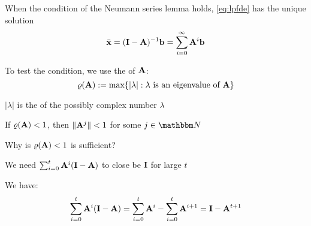 \begin{frame}

    \vspace{.7em}
    When the condition of the Neumann series lemma holds, \eqref{eq:lpfde}
    has the unique solution
    \begin{equation*}
        \bar {{\mathbf x}} 
        = (\mathbf I - \mathbf A)^{-1} {\mathbf b} 
        = \sum_{i=0}^{\infty} \mathbf A^i  {\mathbf b} 
    \end{equation*}
    
    To test the condition, we use the   of
    $\mathbf A$:
    \begin{equation*}
        \label{eq:srmn}
        \varrho(\mathbf A) := \max \{  |\lambda|  :  \lambda \text{ is an eigenvalue of } \mathbf A \}
    \end{equation*}
    
    \vspace{1em}
    $|\lambda|$ is the  of the possibly complex number
    $\lambda$
    

\end{frame}

\begin{frame}

    \vspace{2em}
    \Fact
    If $\varrho(\mathbf A) < 1$, then $\| \mathbf A^j \| < 1$ for some $j \in \NN$
    
    \vspace{.7em}
    Why is $\varrho(\mathbf A) < 1$ is sufficient?
    
    We need
    $\sum_{i=0}^t \mathbf A^i (\mathbf I - \mathbf A)$ to close be $\mathbf I$ for
    large $t$
    
    We have:
    \begin{equation*}
        \sum_{i=0}^t \mathbf A^i (\mathbf I - \mathbf A)
        =
        \sum_{i=0}^t \mathbf A^i - \sum_{i=0}^t \mathbf A^{i+1}
        =
        \mathbf I - \mathbf A^{t+1}
    \end{equation*}

\end{frame}

